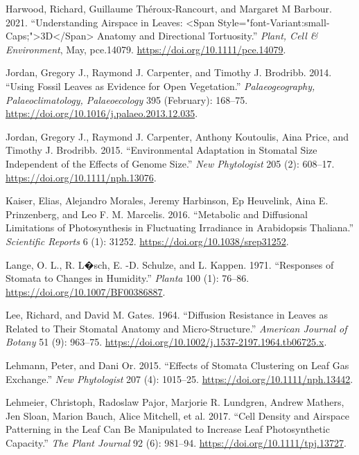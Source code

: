 \documentclass[12pt,halfline,a4paper,]{ouparticle}
\newlength{\cslhangindent}
\newlength{\cslentryspacingunit} %
\newenvironment{CSLReferences}[2] %
 {%
  \setlength{\parindent}{0pt}
  \ifodd #1
  \let\oldpar\par
  \def\par{\hangindent=\cslhangindent\oldpar}
  \fi
  \setlength{\parskip}{#2\cslentryspacingunit}
 }%
 {}
\begin{document}
\begin{CSLReferences}{1}{0}
\leavevmode{}%
Harwood, Richard, Guillaume Théroux‐Rancourt, and Margaret M Barbour.
2021. {``Understanding Airspace in Leaves: {\textless{}}Span
Style="font-Variant:small-Caps;"{\textgreater{}}{3D}{\textless{}}/Span{\textgreater{}}
Anatomy and Directional Tortuosity.''} \emph{Plant, Cell \&
Environment}, May, pce.14079. \url{https://doi.org/10.1111/pce.14079}.

\leavevmode{}%
Jordan, Gregory J., Raymond J. Carpenter, and Timothy J. Brodribb. 2014.
{``Using Fossil Leaves as Evidence for Open Vegetation.''}
\emph{Palaeogeography, Palaeoclimatology, Palaeoecology} 395 (February):
168--75. \url{https://doi.org/10.1016/j.palaeo.2013.12.035}.

\leavevmode{}%
Jordan, Gregory J., Raymond J. Carpenter, Anthony Koutoulis, Aina Price,
and Timothy J. Brodribb. 2015. {``Environmental Adaptation in Stomatal
Size Independent of the Effects of Genome Size.''} \emph{New
Phytologist} 205 (2): 608--17. \url{https://doi.org/10.1111/nph.13076}.

\leavevmode{}%
Kaiser, Elias, Alejandro Morales, Jeremy Harbinson, Ep Heuvelink, Aina
E. Prinzenberg, and Leo F. M. Marcelis. 2016. {``Metabolic and
Diffusional Limitations of Photosynthesis in Fluctuating Irradiance in
{Arabidopsis} Thaliana.''} \emph{Scientific Reports} 6 (1): 31252.
\url{https://doi.org/10.1038/srep31252}.

\leavevmode{}%
Lange, O. L., R. L�sch, E. -D. Schulze, and L. Kappen. 1971.
{``Responses of Stomata to Changes in Humidity.''} \emph{Planta} 100
(1): 76--86. \url{https://doi.org/10.1007/BF00386887}.

\leavevmode{}%
Lee, Richard, and David M. Gates. 1964. {``Diffusion Resistance in
Leaves as Related to Their Stomatal Anatomy and Micro-Structure.''}
\emph{American Journal of Botany} 51 (9): 963--75.
\url{https://doi.org/10.1002/j.1537-2197.1964.tb06725.x}.

\leavevmode{}%
Lehmann, Peter, and Dani Or. 2015. {``Effects of Stomata Clustering on
Leaf Gas Exchange.''} \emph{New Phytologist} 207 (4): 1015--25.
\url{https://doi.org/10.1111/nph.13442}.

\leavevmode{}%
Lehmeier, Christoph, Radoslaw Pajor, Marjorie R. Lundgren, Andrew
Mathers, Jen Sloan, Marion Bauch, Alice Mitchell, et al. 2017. {``Cell
Density and Airspace Patterning in the Leaf Can Be Manipulated to
Increase Leaf Photosynthetic Capacity.''} \emph{The Plant Journal} 92
(6): 981--94. \url{https://doi.org/10.1111/tpj.13727}.


\end{CSLReferences}
\end{document}

